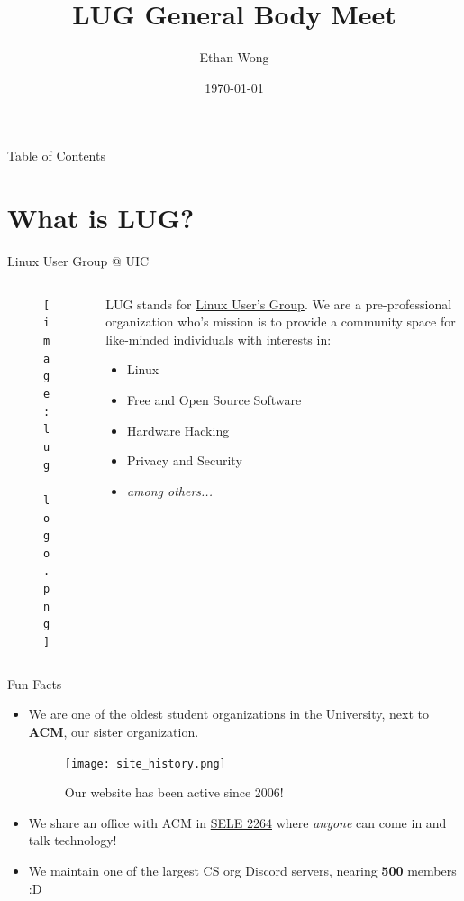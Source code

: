 \documentclass{beamer}
\title{LUG General Body Meet}
\author{Ethan Wong}
\date{\today}
\institute{Linux Users Group @ UIC}
\begin{document}
\begin{frame}
	\titlepage
\end{frame}

\begin{frame}{Table of Contents}
	\tableofcontents[pausesections]
\end{frame}

\section{What is LUG?}
\begin{frame}{Linux User Group @ UIC}
	\begin{columns}
		\begin{column}{0.5\textwidth}
			\begin{figure}
				\centering
				\texttt{[image: lug-logo.png]}
			\end{figure}
		\end{column}
		\begin{column}{0.5\textwidth}
			LUG stands for \underline{Linux User's Group}.
			\pause We are a pre-professional organization who's mission is to
			provide a community space for like-minded individuals with interests
			in:
			\begin{itemize}
				\item Linux
				\item Free and Open Source Software
				\item Hardware Hacking
				\item Privacy and Security
				\item \textit{among others...}
			\end{itemize}
		\end{column}
	\end{columns}
\end{frame}

\begin{frame}{Fun Facts}
	\begin{itemize}
		\item We are one of the oldest student organizations in the University,
			next to \textbf{ACM}, our sister organization.
			\pause
			\begin{figure}
				\centering
				\texttt{[image: site\_history.png]}
				\caption{Our website has been active since 2006!}
			\end{figure}
			\pause
		\item We share an office with ACM in \underline{SELE 2264}
			where \textit{anyone} can come in and talk technology!
			\pause
		\item We maintain one of the largest CS org Discord servers,
			nearing \textbf{500} members :D
	\end{itemize}
\end{frame}
\end{document}
